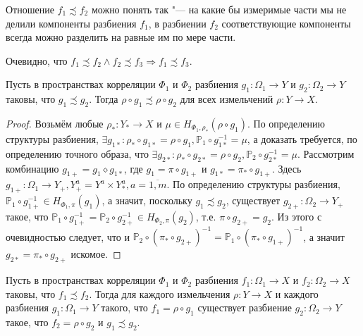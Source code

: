 Отношение $f_1 \precsim f_2$ можно понять так "--- на какие бы измеримые части мы не делили компоненты разбиения $f_1$, в разбиении $f_2$ соответствующие компоненты всегда можно разделить на равные им по мере части.

\begin{remark}
	Очевидно, что $f_1 \precsim f_2 \wedge f_2 \precsim f_3 \Rightarrow f_1 \precsim f_3$.
\end{remark}

\begin{lemma} \label{lemma:up}
	Пусть в пространствах корреляции $\Phi_1$ и $\Phi_2$ разбиения $g_1 : \Omega_1 \rightarrow Y$ и $g_2 : \Omega_2 \rightarrow Y$ таковы, что $g_1 \precsim g_2$. Тогда $\rho \circ g_1 \precsim \rho \circ g_2$ для всех измельчений $\rho : Y \rightarrow X$.
\end{lemma}

\begin{proof}
	Возьмём любые $\rho_* : Y_* \rightarrow X$ и $\mu \in H_{\Phi_1,\rho_*}(\rho \circ g_1)$. По определению структуры разбиения, $\exists g_{1*}: \rho_* \circ g_{1*} = \rho \circ g_1, \mathbb{P}_1 \circ g_{1*}^{-1} = \mu$, а доказать требуется, по определению точного образа, что $\exists g_{2*}: \rho_* \circ g_{2*} = \rho \circ g_2, \mathbb{P}_2 \circ g_{2*}^{-1} = \mu$. Рассмотрим комбинацию $g_{1+} = g_1 \diamond g_{1*}$, где $g_1 = \pi \circ g_{1+}$ и $g_{1*} = \pi_* \circ g_{1+}$. Здесь $g_{1+} : \Omega_1 \rightarrow Y_+, Y_+^a = Y^a \times Y_*^a, a=\overline{1,m}$. По определению структуры разбиения, $\mathbb{P}_1 \circ g_{1+}^{-1} \in H_{\Phi_1,\pi}(g_1)$, а значит, поскольку $g_1 \precsim g_2$, существует $g_{2+} : \Omega_2 \rightarrow Y_+$ такое, что $\mathbb{P}_1 \circ g_{1+}^{-1} = \mathbb{P}_2 \circ g_{2+}^{-1} \in H_{\Phi_2,\pi}(g_2)$, т.е. $\pi \circ g_{2+} = g_2$. Из этого с очевидностью следует, что и $\mathbb{P}_2 \circ (\pi_* \circ g_{2+})^{-1} = \mathbb{P}_1 \circ (\pi_* \circ g_{1+})^{-1}$, а значит $g_{2*} = \pi_* \circ g_{2+}$ искомое.
\end{proof}

\begin{lemma} \label{lemma:down}
	Пусть в пространствах корреляции $\Phi_1$ и $\Phi_2$ разбиения $f_1 : \Omega_1 \rightarrow X$ и $f_2 : \Omega_2 \rightarrow X$ таковы, что $f_1 \precsim f_2$. Тогда для каждого измельчения $\rho : Y \rightarrow X$ и каждого разбиения $g_1 : \Omega_1 \rightarrow Y$ такого, что $f_1 = \rho \circ g_1$ существует разбиение $g_2 : \Omega_2 \rightarrow Y$ такое, что $f_2 = \rho \circ g_2$ и $g_1 \precsim g_2$.
\end{lemma}

